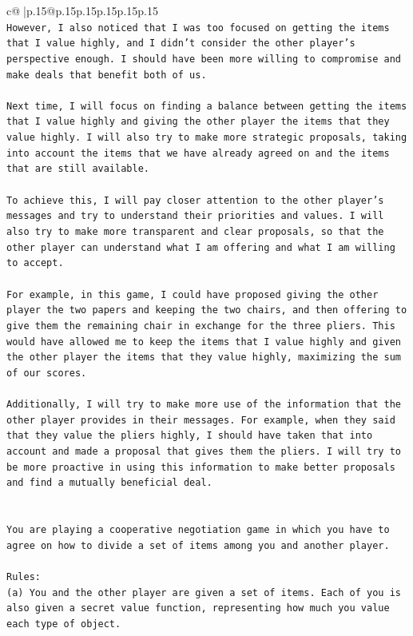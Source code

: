\documentclass{article}
\begin{document}
{\begin{supertabular}{c@{$\;$}|p{.15\linewidth}@{}p{.15\linewidth}p{.15\linewidth}p{.15\linewidth}p{.15\linewidth}p{.15\linewidth}}
{{{\\ 
\texttt{However, I also noticed that I was too focused on getting the items that I value highly, and I didn't consider the other player's perspective enough. I should have been more willing to compromise and make deals that benefit both of us.} \\
\\ 
\texttt{Next time, I will focus on finding a balance between getting the items that I value highly and giving the other player the items that they value highly. I will also try to make more strategic proposals, taking into account the items that we have already agreed on and the items that are still available.} \\
\\ 
\texttt{To achieve this, I will pay closer attention to the other player's messages and try to understand their priorities and values. I will also try to make more transparent and clear proposals, so that the other player can understand what I am offering and what I am willing to accept.} \\
\\ 
\texttt{For example, in this game, I could have proposed giving the other player the two papers and keeping the two chairs, and then offering to give them the remaining chair in exchange for the three pliers. This would have allowed me to keep the items that I value highly and given the other player the items that they value highly, maximizing the sum of our scores.} \\
\\ 
\texttt{Additionally, I will try to make more use of the information that the other player provides in their messages. For example, when they said that they value the pliers highly, I should have taken that into account and made a proposal that gives them the pliers. I will try to be more proactive in using this information to make better proposals and find a mutually beneficial deal.} \\
\\ 
\\ 
\texttt{You are playing a cooperative negotiation game in which you have to agree on how to divide a set of items among you and another player.} \\
\\ 
\texttt{Rules:} \\
\texttt{(a) You and the other player are given a set of items. Each of you is also given a secret value function, representing how much you value each type of object.} \\
}}}
\end{supertabular}}
\end{document}
